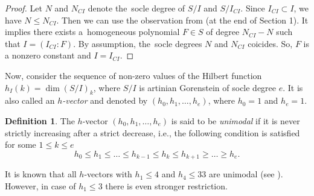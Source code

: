 \documentclass[a4paper,11pt,english,german]{amsart}
\theoremstyle{definition}
\newtheorem{Def}[thm]{Definition}
\begin{document}
\begin{proof}
Let $N$ and $N_{CI}$ denote the~socle degree of $S/I$ and $S/I_{CI}$. Since $I_{CI}\subset I$, we have $N\leqslant N_{CI}$.
 Then we can use the observation from \cite{otwinowska2002} (at the end of Section 1). It implies there exists a~homogeneous polynomial $F\in S$ of degree $N_{CI}-N$ such that $I=(I_{CI}:F)$. By assumption, the~socle degrees $N$ and $N_{CI}$ coicides. So, $F$ is a nonzero constant and $I=I_{CI}$.
\end{proof}



Now, consider the sequence of non-zero values of the Hilbert function $h_I(k)=\dim (S/I)_k$, where $S/I$ is artinian Gorenstein of socle degree $e$. It is also called an $h$\emph{-vector} and denoted by $(h_0,h_1,\dots,h_e)$, where $h_0=1$ and $h_e=1$.

\begin{Def}
	The $h$-vector $(h_0,h_1,\dots,h_e)$ is said to be \emph{unimodal} if it is never strictly increasing after a strict decrease, i.e., the following condition is satisfied for some $1\leqslant k \leqslant e$
	\begin{equation*}
		h_0 \leqslant h_1 \leqslant \dots \leqslant h_{k-1} \leqslant h_k \leqslant h_{k+1} \geqslant \dots \geqslant h_e.
	\end{equation*}
\end{Def}

It is known that all $h$-vectors with $h_1\leqslant 4$ and $h_4\leqslant 33$ are unimodal (see \cite[Theorem 3.1]{migliore2007characterization}). However, in case of $h_1\leqslant 3$ there is even stronger restriction.
\end{document}
